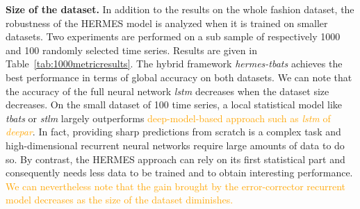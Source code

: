 \documentclass[10pt]{article} %
\begin{document}
\textbf{Size of the dataset. } In addition to the results on the whole fashion dataset, the robustness of the HERMES model is analyzed when it is trained on smaller datasets. Two experiments are performed on a sub sample of respectively 1000 and 100 randomly selected time series. Results are given in Table~\ref{tab:1000metricresults}. The hybrid framework \textit{hermes-tbats} achieves the best performance in terms of global accuracy on both datasets. We can note that the accuracy of the full neural network \textit{lstm} decreases when the dataset size decreases. On the small dataset of 100 time series, a local statistical model like \textit{tbats} or \textit{stlm} largely outperforms \textcolor{orange}{deep-model-based approach such as \textit{lstm} of \textit{deepar}}. In fact, providing sharp predictions from scratch is a complex task and high-dimensional recurrent neural networks require large amounts of data to do so. By contrast, the HERMES approach can rely on its first statistical part and consequently needs less data to be trained and to obtain interesting performance. \textcolor{orange}{We can nevertheless note that the gain brought by the error-corrector recurrent model decreases as the size of the dataset diminishes.}
\end{document}
